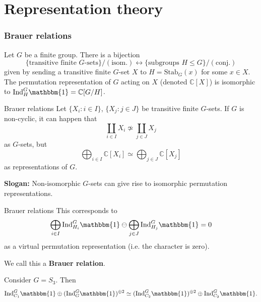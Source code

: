 \documentclass{beamer}
\newcommand{\trivial}{\mathbbm{1}}
\newcommand{\Ind}{\mathrm{Ind}}
\newcommand{\Stab}{\mathrm{Stab}}
\newcommand{\bC}{\mathbb{C}}
\theoremstyle{plain}
\begin{document}
\section*{Representation theory}
\frame{\sectionpage}


\begin{frame}
    \frametitle{Brauer relations}
    Let $G$ be a finite group. \pause There is a bijection 
    \[ \{ \text{transitive finite } G \text{-sets}\}/(\text{isom.})\leftrightarrow \{ \text{subgroups } H \leq G \}/(\text{conj.})\] 
    given by sending a transitive finite $G$-set $X$ to $H = \Stab_{G} (x)$ for some $x \in X$. \pause The permutation representation of $G$ acting on $X$ (denoted $\bC[X]$) is isomorphic to $\Ind_{H}^G \trivial  = \bC[G / H]$. 
\end{frame}

\begin{frame}{Brauer relations}
    Let $\{ X_i \colon i \in I\}$, $\{X_j \colon j \in J \}$ be transitive finite $G$-sets. If $G$ is non-cyclic, it can happen that
    \[ \coprod_{i \in I} X_i \not\simeq \coprod_{j \in J} X_j  \]
    as $G$-sets, but \pause 
    \[ \bigoplus_{i \in I}\bC[ X_i] \simeq \bigoplus_{j \in J} \bC[ X_j]\] 
    as representations of $G$. \pause

    \textbf{Slogan:} Non-isomorphic $G$-sets can give rise to isomorphic permutation representations.

\end{frame}

\begin{frame}{Brauer relations}
    This corresponds to  
    \[ \bigoplus_{i \in I} \Ind_{H_i}^G \trivial \ominus \bigoplus_{j \in J} \Ind_{H_j}^G \trivial = 0 \] 
    as a virtual permutation representation (i.e. the character is zero). 

    We call this a \textbf{Brauer relation}.\pause

    \begin{example}
        Consider $G = S_3$. \pause 
        Then 
        \[ \Ind_{C_1}^G \trivial \oplus (\Ind_{G}^G \trivial )^{\oplus 2} \simeq (\Ind_{C_2}^G \trivial)^{\oplus 2} \oplus \Ind_{C_3}^G \trivial .\] 
    \end{example}
\end{frame}
\end{document}
